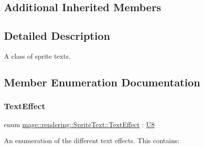 \subsection*{Additional Inherited Members}


\subsection{Detailed Description}
A class of sprite texts. 

\subsection{Member Enumeration Documentation}
\mbox{\label{classmage_1_1rendering_1_1_sprite_text_af07ecf28d2ab8997c011cab74e799ef7}} 
\subsubsection{\texorpdfstring{Text\+Effect}{TextEffect}}
{\footnotesize\ttfamily enum \mbox{\hyperlink{classmage_1_1rendering_1_1_sprite_text_af07ecf28d2ab8997c011cab74e799ef7}{mage\+::rendering\+::\+Sprite\+Text\+::\+Text\+Effect}} \+: \mbox{\hyperlink{namespacemage_afc638980bc6154f15af5e2d93a0e0ea9}{U8}}\hspace{0.3cm}{\ttfamily [strong]}}

An enumeration of the different text effects. This contains\+:

